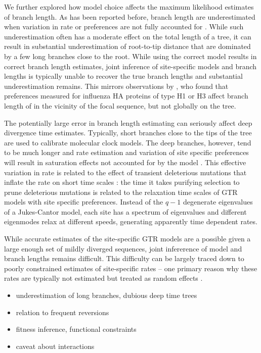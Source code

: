 \documentclass[aps,rmp,twocolumn]{revtex4}
\begin{document}
We further explored how model choice affects the maximum likelihood estimates of branch length.
As has been reported before, branch length are underestimated when variation in rate or preferences are not fully accounted for \citep{halpern1998evolutionary,hilton_modeling_2018}.
While such underestimation often has a moderate effect on the total length of a tree, it can result in substantial underestimation of root-to-tip distance that are dominated by a few long branches close to the root.
While using the correct model results in correct branch length estimates, joint inference of site-specific models and branch lengths is typically unable to recover the true branch lengths and substantial underestimation remains.
This mirrors observations by \citet{hilton_modeling_2018}, who found that preferences measured for influenza HA proteins of type H1 or H3 affect branch length of in the vicinity of the focal sequence, but not globally on the tree.

The potentially large error in branch length estimating can seriously affect deep divergence time estimates.
Typically, short branches close to the tips of the tree are used to calibrate molecular clock models.
The deep branches, however, tend to be much longer and rate estimation and variation of site specific preferences will result in saturation effects not accounted for by the model \citep{hilton_modeling_2018}.
This effective variation in rate is related to the effect of transient deleterious mutations that inflate the rate on short time scales \citep{ho_time_2005}: the time it takes purifying selection to prune deleterious mutations is related to the relaxation time scales of GTR models with site specific preferences.
Instead of the $q-1$ degenerate eigenvalues of a Jukes-Cantor model, each site has a spectrum of eigenvalues and different eigenmodes relax at different speeds, generating apparently time dependent rates.

While accurate estimates of the site-specific GTR models are a possible given a large enough set of mildly diverged sequences, joint infererence of model and branch lengths remains difficult.
This difficulty can be largely traced down to poorly constrained estimates of site-specific rates -- one primary reason why these rates are typically not estimated but treated as random effects \citep{yang1996among}.





\begin{itemize}
	\item underestimation of long branches, dubious deep time trees
	\item relation to frequent reversions
	\item fitness inference, functional constraints
	\item caveat about interactions
\end{itemize}
\end{document}
